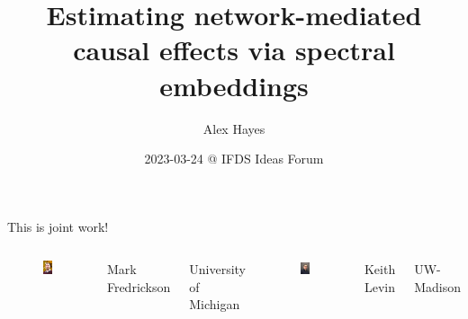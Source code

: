 \documentclass{beamer}
\title{Estimating network-mediated causal effects via spectral embeddings}
\date{2023-03-24 @ IFDS Ideas Forum}
\author{Alex Hayes}
\institute{Department of Statistics, University of Wisconsin-Madison}
\theoremstyle{remark}
\begin{document}
\maketitle

\begin{frame}{This is joint work!}

    \begin{columns}
        \centering


        \begin{figure}
            \includegraphics[width=4cm]{figures/mark.jpg}
        \end{figure}

        \centering

        Mark Fredrickson

        University of Michigan

        \centering

        \begin{figure}
            \includegraphics[width=4cm]{figures/keith.jpg}
        \end{figure}

        Keith Levin

        UW-Madison

    \end{columns}

\end{frame}
\end{document}
